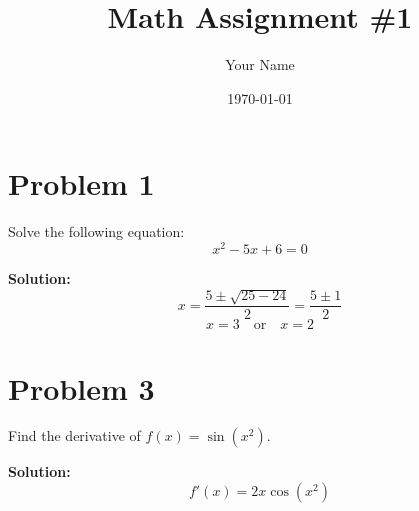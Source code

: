 \documentclass{article}
\begin{document}
	
	\title{Math Assignment \#1}
	\author{Your Name}
	\date{\today}
	\maketitle
	
	\section*{Problem 1}
	Solve the following equation:
	\[
	x^2 - 5x + 6 = 0
	\]
	
	\textbf{Solution:}
	\[
	x = \frac{5 \pm \sqrt{25 - 24}}{2} = \frac{5 \pm 1}{2}
	\]
	\[
	x = 3 \quad \text{or} \quad x = 2
	\]
	
	\section*{Problem 3}
	Find the derivative of $f(x) = \sin(x^2)$.
	
	\textbf{Solution:}
	\[
	f'(x) = 2x \cos(x^2)
	\]
	
\end{document}
